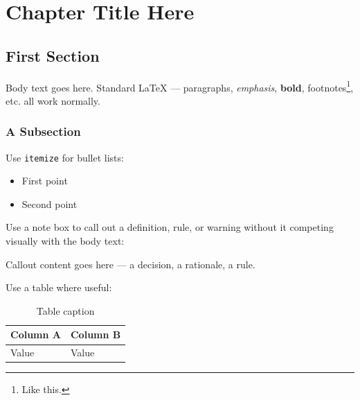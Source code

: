 
\chapter{Chapter Title Here}

\section{First Section}

Body text goes here. Standard LaTeX — paragraphs, \emph{emphasis},
\textbf{bold}, footnotes\footnote{Like this.}, etc. all work normally.

\subsection{A Subsection}

Use \texttt{itemize} for bullet lists:

\begin{itemize}
  \item First point
  \item Second point
\end{itemize}

Use a note box to call out a definition, rule, or warning without
it competing visually with the body text:

\begin{sentinelnote}
Callout content goes here — a decision, a rationale, a rule.
\end{sentinelnote}

Use a table where useful:

\begin{table}[h]
  \centering
  \begin{tabular}{@{}ll@{}}
    \toprule
    \textbf{Column A} & \textbf{Column B} \\
    \midrule
    Value & Value \\
    \bottomrule
  \end{tabular}
  \caption{Table caption}
\end{table}

\sentinelchapterend
